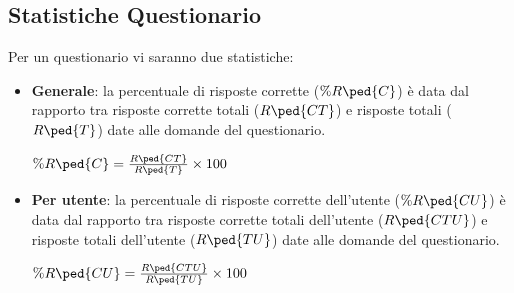 \subsection{Statistiche Questionario}
Per un questionario vi saranno due statistiche:
\begin{itemize}
	\item \textbf{Generale}: la percentuale di risposte corrette ($\%R\ped{C}$) è data dal rapporto tra risposte corrette totali ($R\ped{CT}$) e risposte totali ($R\ped{T}$) date alle domande del questionario.
	\begin{center}
	$\%R\ped{C} = \frac{R\ped{CT}}{R\ped{T}}\times{100}$
	\end{center}
	\item \textbf{Per utente}: la percentuale di risposte corrette dell'utente ($\%R\ped{CU}$) è data dal rapporto tra risposte corrette totali dell'utente ($R\ped{CTU}$) e risposte totali dell'utente ($R\ped{TU}$) date alle domande del questionario.
	\begin{center}
	$\%R\ped{CU} = \frac{R\ped{CTU}}{R\ped{TU}}\times{100}$
	\end{center}
\end{itemize}
